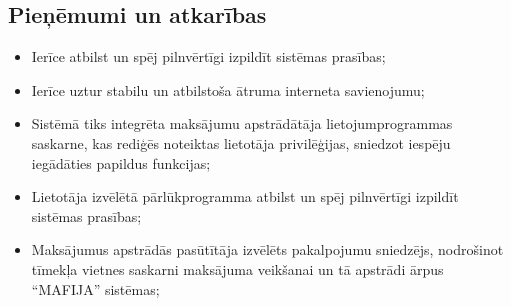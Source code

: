 \subsection{Pieņēmumi un atkarības}
\begin{itemize}
    \item Ierīce atbilst un spēj pilnvērtīgi izpildīt sistēmas prasības;

    \item Ierīce uztur stabilu un atbilstoša ātruma interneta savienojumu;

    \item Sistēmā tiks integrēta maksājumu apstrādātāja lietojumprogrammas
        saskarne, kas rediģēs noteiktas lietotāja privilēģijas, sniedzot
        iespēju iegādāties papildus funkcijas;

    \item Lietotāja izvēlētā pārlūkprogramma atbilst un spēj pilnvērtīgi
        izpildīt sistēmas prasības;

    \item Maksājumus apstrādās pasūtītāja izvēlēts pakalpojumu sniedzējs,
        nodrošinot tīmekļa vietnes saskarni maksājuma veikšanai un tā apstrādi
        ārpus “MAFIJA” sistēmas;

\end{itemize}
